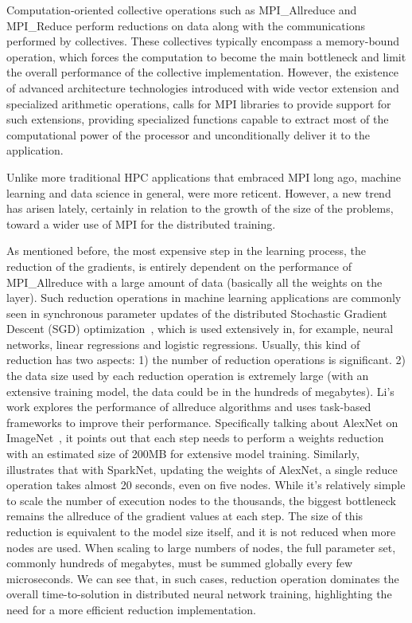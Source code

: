 \documentclass[5p,times,twocolumn]{elsarticle}
\newcommand{\mpi}[0]{\textsc{MPI}\xspace}
\newcommand{\sve}[0]{\textsc{SVE}\xspace}
\begin{document}
Computation-oriented collective operations such as MPI\_Allreduce and MPI\_Reduce perform reductions on
data along with the communications performed by collectives.
These collectives typically encompass a memory-bound operation, which forces
the computation to become the main bottleneck and limit the overall performance of the collective implementation.
However, the existence of advanced architecture technologies introduced
with wide vector extension and specialized arithmetic operations, calls for
MPI libraries to provide support for such extensions, providing specialized functions
capable to extract most of the computational power of the processor and unconditionally deliver it to the application.


Unlike more traditional HPC applications that embraced MPI long ago,
machine learning and data science in general, were more reticent. However,
a new trend has arisen lately, certainly in relation to the growth
of the size of the problems, toward a wider use of \mpi for the distributed training.

As mentioned before, the most expensive step in the learning process, the reduction of the gradients, is entirely dependent on the performance of MPI\_Allreduce with a large amount of data (basically all the weights on the layer).
Such reduction operations in machine learning applications
are commonly seen in synchronous parameter updates of the distributed Stochastic
Gradient Descent (SGD) optimization~\cite{sgd10}, which is used extensively
in, for example, neural networks, linear regressions and logistic
regressions. Usually, this kind of reduction has two aspects: 1) the number of reduction
operations is significant. 2) the data size used by each reduction operation is extremely large (with an extensive training model, the data could be in the hundreds of megabytes).
%
Li's~\cite{inproceedings} work explores the performance of allreduce algorithms
and uses task-based frameworks to improve their performance. Specifically talking about AlexNet on ImageNet~\cite{NIPS20124824}, it points out that
each step needs to perform a weights reduction with an estimated size
of 200MB for extensive model training.
%
Similarly, \cite{moritz2015sparknet}
illustrates that with SparkNet, updating the weights of AlexNet, a single reduce
operation takes almost 20 seconds, even on five nodes. While it's relatively simple to scale
the number of execution nodes to the thousands, the biggest bottleneck remains the allreduce of
the gradient values at each step. The size of this reduction is equivalent
to the model size itself, and it is not reduced when more
nodes are used. When scaling to large numbers of nodes, the full parameter set, commonly hundreds of
megabytes, must be summed globally every few microseconds. We can see that, in such cases,
reduction operation dominates the overall time-to-solution in distributed neural network
training, highlighting the need for a more efficient reduction implementation.
\end{document}
